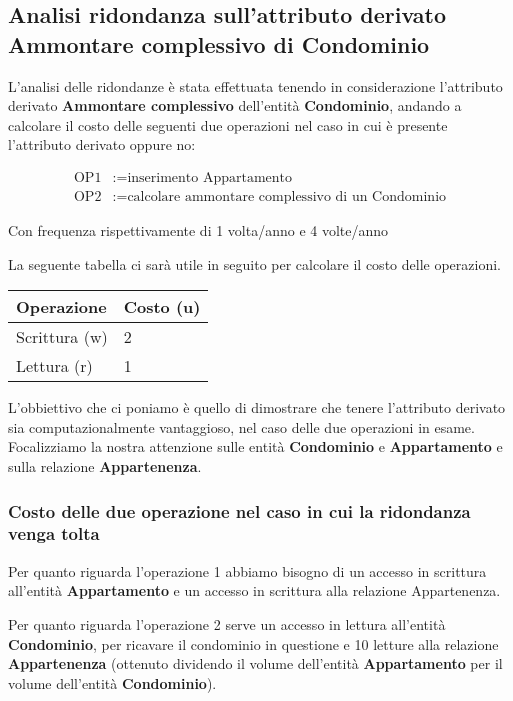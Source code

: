 \subsection{Analisi ridondanza sull'attributo derivato Ammontare complessivo di Condominio}

L'analisi delle ridondanze è stata effettuata tenendo in considerazione l'attributo derivato \textbf{Ammontare complessivo} dell'entità \textbf{Condominio}, andando a calcolare il costo delle seguenti due operazioni nel caso in cui è presente l'attributo derivato oppure no:

\[
\begin{aligned}
\text{OP1} & := \text{inserimento Appartamento} \\
\text{OP2} & := \text{calcolare ammontare complessivo di un Condominio}
\end{aligned}
\]

Con frequenza rispettivamente di 1 volta/anno e 4 volte/anno

La seguente tabella ci sarà utile in seguito per calcolare il costo delle operazioni.

\bigskip

\begin{tabular}{|l|l|}
	\hline
	Operazione & Costo (u) \\ \hline
	Scrittura (w) & 2 \\ \hline
	Lettura (r) & 1 \\ \hline
\end{tabular}

\bigskip

L'obbiettivo che ci poniamo è quello di dimostrare che tenere l'attributo derivato sia computazionalmente vantaggioso, nel caso delle due operazioni in esame. Focalizziamo la nostra attenzione sulle entità \textbf{Condominio} e \textbf{Appartamento} e sulla relazione \textbf{Appartenenza}.

\subsubsection{Costo delle due operazione nel caso in cui la ridondanza venga tolta}

Per quanto riguarda l'operazione 1 abbiamo bisogno di un accesso in scrittura all'entità \textbf{Appartamento} e un accesso in scrittura alla relazione Appartenenza.

Per quanto riguarda l'operazione 2 serve un accesso in lettura all'entità \textbf{Condominio}, per ricavare il condominio in questione e 10 letture alla relazione \textbf{Appartenenza} (ottenuto dividendo il volume dell'entità \textbf{Appartamento} per il volume dell'entità \textbf{Condominio}).

